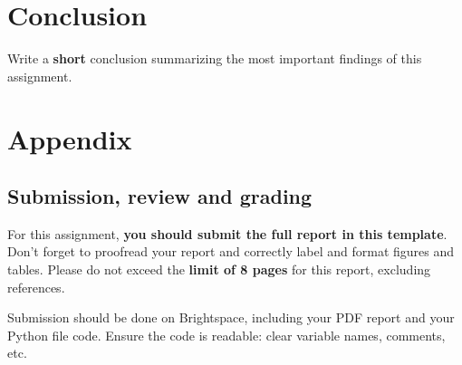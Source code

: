 \documentclass[runningheads]{llncs}
\begin{document}
\section{Conclusion}\label{sec:conclusion}
Write a \textbf{short} conclusion summarizing the most important findings of this assignment. 

\appendix
\section{Appendix}
\subsection{Submission, review and grading}\label{sec:submission}
For this assignment, \textbf{you should submit the full report in this template}. Don’t forget to proofread your report and correctly label and format figures and tables. Please do not exceed the \textbf{limit of 8 pages} for this report, excluding references.

Submission should be done on Brightspace, including your PDF report and your Python file code. Ensure the code is readable: clear variable names, comments, etc. 



\end{document}
